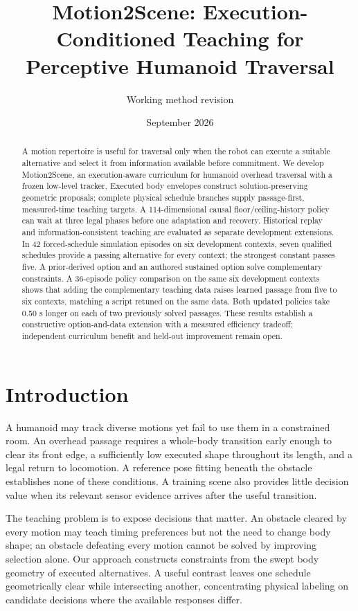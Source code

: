 \documentclass[10pt]{article}
\title{Motion2Scene: Execution-Conditioned Teaching for Perceptive Humanoid Traversal}
\author{Working method revision}
\date{September 2026}
\begin{document}
\maketitle
\begin{abstract}
A motion repertoire is useful for traversal only when the robot can execute a
suitable alternative and select it from information available before commitment.
We develop Motion2Scene, an execution-aware curriculum for humanoid overhead
traversal with a frozen low-level tracker. Executed body envelopes construct
solution-preserving geometric proposals; complete physical schedule branches
supply passage-first, measured-time teaching targets. A 114-dimensional causal
floor/ceiling-history policy can wait at three legal phases before one adaptation
and recovery. Historical replay and information-consistent teaching are evaluated
as separate development extensions. In 42 forced-schedule simulation episodes on six
development contexts, seven qualified schedules provide a passing alternative
for every context; the strongest constant passes five. A prior-derived option
and an authored sustained option solve complementary constraints. A 36-episode
policy comparison on the same six development contexts shows that adding the
complementary teaching data raises learned passage from five to six contexts,
matching a script retuned on the same data. Both updated policies take 0.50 s
longer on each of two previously solved passages. These results establish a
constructive option-and-data extension with a measured efficiency tradeoff;
independent curriculum benefit and held-out improvement remain open.
\end{abstract}

\section{Introduction}
A humanoid may track diverse motions yet fail to use them in a constrained room.
An overhead passage requires a whole-body transition early enough to clear its
front edge, a sufficiently low executed shape throughout its length, and a legal
return to locomotion. A reference pose fitting beneath the obstacle establishes
none of these conditions. A training scene also provides little decision value
when its relevant sensor evidence arrives after the useful transition.

The teaching problem is to expose decisions that matter. An obstacle cleared by
every motion may teach timing preferences but not the need to change body shape;
an obstacle defeating every motion cannot be solved by improving selection alone.
Our approach constructs constraints from the swept body geometry of executed
alternatives. A useful contrast leaves one schedule geometrically clear while
intersecting another, concentrating physical labeling on candidate decisions
where the available responses differ.
\end{document}
